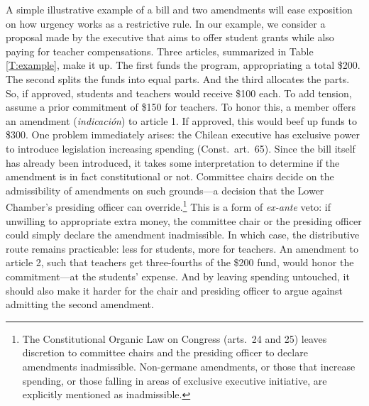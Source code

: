 \documentclass[letter,12pt]{article}
\begin{document}
A simple illustrative example of a bill and two amendments will ease exposition on how urgency works as a restrictive rule. In our example, we consider a proposal made by the executive that aims to offer student grants while also paying for teacher compensations. Three articles, summarized in Table \ref{T:example}, make it up. The first funds the program, appropriating a total \$200. The second splits the funds into equal parts. And the third allocates the parts. So, if approved, students and teachers would receive \$100 each. To add tension, assume a prior commitment of \$150 for teachers. To honor this, a member offers an amendment (\emph{indicación}) to article 1. If approved, this would beef up funds to \$300. One problem immediately arises: the Chilean executive has exclusive power to introduce legislation increasing spending (Const.\ art.\ 65). Since the bill itself has already been introduced, it takes some interpretation to determine if the amendment is in fact constitutional or not. Committee chairs decide on the admissibility of amendments on such grounds---a decision that the Lower Chamber's presiding officer can override.\footnote{The Constitutional Organic Law on Congress (arts.\ 24 and 25) leaves discretion to committee chairs and the presiding officer to declare amendments inadmissible. Non-germane amendments, or those that increase spending, or those falling in areas of exclusive executive initiative, are explicitly mentioned as inadmissible.} This is a form of \emph{ex-ante} veto: if unwilling to appropriate extra money, the committee chair or the presiding officer could simply declare the amendment inadmissible. In which case, the distributive route remains practicable: less for students, more for teachers. An amendment to article 2, such that teachers get three-fourths of the \$200 fund, would honor the commitment---at the students' expense. And by leaving spending untouched, it should also make it harder for the chair and presiding officer to argue against admitting the second amendment. 
\end{document}
